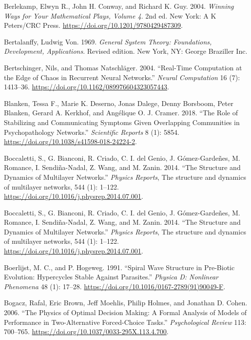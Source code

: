 \documentclass[
  a4paper,
  DIV=11,
  numbers=noendperiod,
  oneside]{scrreprt}
\newlength{\cslhangindent}
\newenvironment{CSLReferences}[2] %
 {\begin{list}{}{%
  \setlength{\itemindent}{0pt}
  \setlength{\leftmargin}{0pt}
  \setlength{\parsep}{0pt}
  \ifodd #1
   \setlength{\leftmargin}{\cslhangindent}
   \setlength{\itemindent}{-1\cslhangindent}
  \fi
  \setlength{\itemsep}{#2\baselineskip}}}
 {\end{list}}
\begin{document}
\begin{CSLReferences}{1}{0}
Berlekamp, Elwyn R., John H. Conway, and Richard K. Guy. 2004.
\emph{Winning {Ways} for {Your Mathematical Plays}, {Volume} 4}. 2nd ed.
{New York}: {A K Peters/CRC Press}.
\url{https://doi.org/10.1201/9780429487309}.

Bertalanffy, Ludwig Von. 1969. \emph{General {System Theory}:
{Foundations}, {Development}, {Applications}}. Revised edition. {New
York, NY}: {George Braziller Inc.}

Bertschinger, Nils, and Thomas Natschläger. 2004. {``Real-{Time
Computation} at the {Edge} of {Chaos} in {Recurrent Neural Networks}.''}
\emph{Neural Computation} 16 (7): 1413--36.
\url{https://doi.org/10.1162/089976604323057443}.

Blanken, Tessa F., Marie K. Deserno, Jonas Dalege, Denny Borsboom, Peter
Blanken, Gerard A. Kerkhof, and Angélique O. J. Cramer. 2018. {``The
Role of Stabilizing and Communicating Symptoms Given Overlapping
Communities in Psychopathology Networks.''} \emph{Scientific Reports} 8
(1): 5854. \url{https://doi.org/10.1038/s41598-018-24224-2}.

Boccaletti, S., G. Bianconi, R. Criado, C. I. del Genio, J.
Gómez-Gardeñes, M. Romance, I. Sendiña-Nadal, Z. Wang, and M. Zanin.
2014. {``The Structure and Dynamics of Multilayer Networks.''}
\emph{Physics Reports}, The structure and dynamics of multilayer
networks, 544 (1): 1--122.
\url{https://doi.org/10.1016/j.physrep.2014.07.001}.

Boccaletti, S., G. Bianconi, R. Criado, C. I. del Genio, J.
Gómez-Gardeñes, M. Romance, I. Sendiña-Nadal, Z. Wang, and M. Zanin.
2014. {``The Structure and Dynamics of Multilayer Networks.''}
\emph{Physics Reports}, The structure and dynamics of multilayer
networks, 544 (1): 1--122.
\url{https://doi.org/10.1016/j.physrep.2014.07.001}.

Boerlijst, M. C., and P. Hogeweg. 1991. {``Spiral Wave Structure in
Pre-Biotic Evolution: {Hypercycles} Stable Against Parasites.''}
\emph{Physica D: Nonlinear Phenomena} 48 (1): 17--28.
\url{https://doi.org/10.1016/0167-2789(91)90049-F}.

Bogacz, Rafal, Eric Brown, Jeff Moehlis, Philip Holmes, and Jonathan D.
Cohen. 2006. {``The Physics of Optimal Decision Making: {A} Formal
Analysis of Models of Performance in Two-Alternative Forced-Choice
Tasks.''} \emph{Psychological Review} 113: 700--765.
\url{https://doi.org/10.1037/0033-295X.113.4.700}.


\end{CSLReferences}
\end{document}
